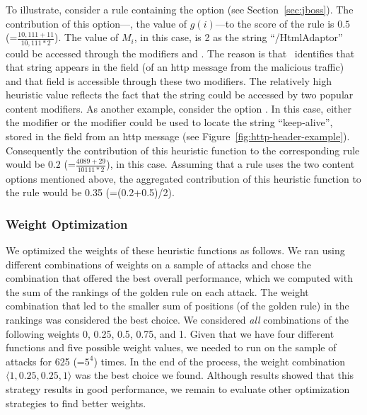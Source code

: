 \documentclass[conference]{IEEEtran}
\begin{document}
To illustrate, consider a rule containing the option
 (see Section~\ref{sec:jboss}). The
contribution of this option---\ie{}, the value of $\mathit{g(i)}$---to
the score of the rule is $0.5$ (=$\frac{10,111+11}{10,111*2}$). The
value of $M_i$, in this case, is 2 as the string ``/HtmlAdaptor''
could be accessed through the modifiers  and
. The reason is that \tname\ identifies that
that string appears in the field  (of an http
message from the malicious traffic) and that field is accessible
through these two modifiers. The relatively high heuristic value
reflects the fact that the string could be accessed by two popular
content modifiers.  As another example, consider the option
. In this case, either the modifier
 or the modifier  could be used to
locate the string ``keep-alive'', stored in the field
 from an http message (see
Figure~\ref{fig:http-header-example}). Consequently the contribution
of this heuristic function to the corresponding rule would be $0.2$
(=$\frac{4089+29}{10111*2}$), in this case. Assuming that a rule uses
the two content options mentioned above, the aggregated contribution
of this heuristic function to the rule would be 0.35 (=(0.2+0.5)/2).

\subsubsection{Weight Optimization}
\label{sec:weight-optimization}
We optimized the weights of these heuristic functions as follows. We
ran \tname{} using different combinations of weights on a sample of
attacks and chose the combination that offered the best overall
performance, which we computed with the sum of the rankings of the
golden rule on each attack. The weight combination that led to the
smaller sum of positions (of the golden rule) in the rankings was
considered the best choice. We considered \emph{all} combinations of
the following weights 0, 0.25, 0.5, 0.75, and 1. Given that we have
four different functions and five possible weight values, we needed to
run \tname{} on the sample of attacks for 625 (=$5^4$) times. In the
end of the process, the weight combination
$\langle{}1,0.25,0.25,1\rangle$ was the best choice we found. Although
results showed that this strategy results in good performance, we
remain to evaluate other optimization strategies to find better
weights.

 
\end{document}
